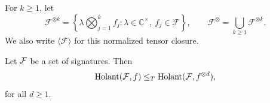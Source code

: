 For $k\ge1$, let
\[
\mathcal F^{\otimes k}
=\left\{\lambda\bigotimes_{j=1}^k f_j:
  \lambda\in\mathbb C^\times,\ f_j\in\mathcal F\right\},\qquad
\mathcal F^\otimes=\bigcup_{k\ge1}\mathcal F^{\otimes k}.
\]
We also write $\langle\mathcal F\rangle$ for this normalized tensor
closure.

\begin{lemma}\label{lm: decomposition of tensor power}
    Let $\mathcal{F}$ be a set of signatures. Then
    $$
        \operatorname{Holant}(\mathcal{F},f)\leq_T \operatorname{Holant}(\mathcal{F},f^{\otimes d}),
    $$
    for all $d\geq 1$.
\end{lemma}
